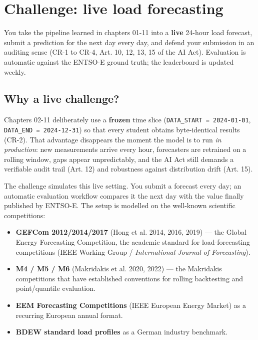 \documentclass[
  english,
  letterpaper,
]{scrbook}
\providecommand{\tightlist}{%
  \setlength{\itemsep}{0pt}\setlength{\parskip}{0pt}}
\begin{document}

\chapter{Challenge: live load forecasting}\label{sec-challenge}

\begin{tcolorbox}[enhanced jigsaw, arc=.35mm, bottomrule=.15mm, bottomtitle=1mm, breakable, colback=white, colbacktitle=quarto-callout-note-color!10!white, colframe=quarto-callout-note-color-frame, coltitle=black, left=2mm, leftrule=.75mm, opacityback=0, opacitybacktitle=0.6, rightrule=.15mm, title=\textcolor{quarto-callout-note-color}{\faInfo}\hspace{0.5em}{Learning objective}, titlerule=0mm, toprule=.15mm, toptitle=1mm]

You take the pipeline learned in chapters 01-11 into a \textbf{live}
24-hour load forecast, submit a prediction for the next day every day,
and defend your submission in an auditing sense (CR-1 to CR-4, Art. 10,
12, 13, 15 of the AI Act). Evaluation is automatic against the ENTSO-E
ground truth; the leaderboard is updated weekly.

\end{tcolorbox}

\section{Why a live challenge?}\label{why-a-live-challenge}

Chapters 02-11 deliberately use a \textbf{frozen} time slice
(\texttt{DATA\_START\ =\ 2024-01-01}, \texttt{DATA\_END\ =\ 2024-12-31})
so that every student obtains byte-identical results (CR-2). That
advantage disappears the moment the model is to run \emph{in
production}: new measurements arrive every hour, forecasters are
retrained on a rolling window, gaps appear unpredictably, and the AI Act
still demands a verifiable audit trail (Art. 12) and robustness against
distribution drift (Art. 15).

The challenge simulates this live setting. You submit a forecast every
day; an automatic evaluation workflow compares it the next day with the
value finally published by ENTSO-E. The setup is modelled on the
well-known scientific competitions:

\begin{itemize}
\tightlist
\item
  \textbf{GEFCom 2012/2014/2017} (Hong et al. 2014, 2016, 2019) --- the
  Global Energy Forecasting Competition, the academic standard for
  load-forecasting competitions (IEEE Working Group /
  \emph{International Journal of Forecasting}).
\item
  \textbf{M4 / M5 / M6} (Makridakis et al. 2020, 2022) --- the
  Makridakis competitions that have established conventions for rolling
  backtesting and point/quantile evaluation.
\item
  \textbf{EEM Forecasting Competitions} (IEEE European Energy Market) as
  a recurring European annual format.
\item
  \textbf{BDEW standard load profiles} as a German industry benchmark.
\end{itemize}
\end{document}
